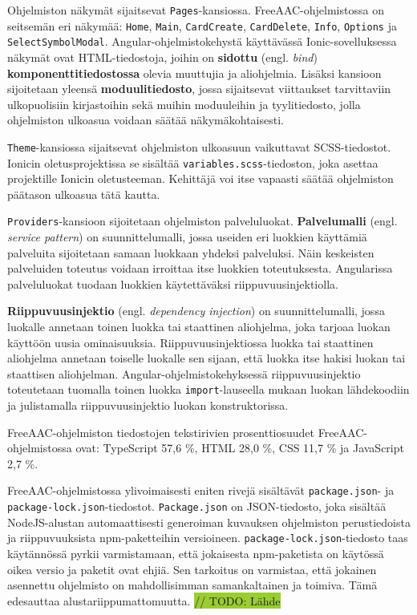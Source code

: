 \documentclass[utf8]{gradu3}
\begin{document}
Ohjelmiston näkymät sijaitsevat \texttt{Pages}-kansiossa. FreeAAC-ohjelmistossa on seitsemän eri näkymää: \texttt{Home}, \texttt{Main}, \texttt{CardCreate}, \texttt{CardDelete}, \texttt{Info}, \texttt{Options} ja \texttt{SelectSymbolModal}. Angular-ohjelmistokehystä käyttävässä Ionic-sovelluksessa näkymät ovat HTML-tiedostoja, joihin on \textbf{sidottu} (engl. \textit{bind}) \textbf{komponenttitiedostossa} olevia muuttujia ja aliohjelmia. Lisäksi kansioon sijoitetaan yleensä \textbf{moduulitiedosto}, jossa sijaitsevat viittaukset tarvittaviin ulkopuolisiin kirjastoihin sekä muihin moduuleihin ja tyylitiedosto, jolla ohjelmiston ulkoasua voidaan säätää näkymäkohtaisesti.

\texttt{Theme}-kansiossa sijaitsevat ohjelmiston ulkoasuun vaikuttavat SCSS-tiedostot. Ionicin oletusprojektissa se sisältää \texttt{variables.scss}-tiedoston, joka asettaa projektille Ionicin oletusteeman. Kehittäjä voi itse vapaasti säätää ohjelmiston päätason ulkoasua tätä kautta.

\texttt{Providers}-kansioon sijoitetaan ohjelmiston palveluluokat. \textbf{Palvelumalli} (engl. \textit{service pattern}) on suunnittelumalli, jossa useiden eri luokkien käyttämiä palveluita sijoitetaan samaan luokkaan yhdeksi palveluksi. Näin keskeisten palveluiden toteutus voidaan irroittaa itse luokkien toteutuksesta. Angularissa palveluluokat tuodaan luokkien käytettäväksi riippuvuusinjektiolla.

\textbf{Riippuvuusinjektio} (engl. \textit{dependency injection}) on suunnittelumalli, jossa luokalle annetaan toinen luokka tai staattinen aliohjelma, joka tarjoaa luokan käyttöön uusia ominaisuuksia. Riippuvuusinjektiossa luokka tai staattinen aliohjelma annetaan toiselle luokalle sen sijaan, että luokka itse hakisi luokan tai staattisen aliohjelman. Angular-ohjelmistokehyksessä riippuvuusinjektio toteutetaan tuomalla toinen luokka \texttt{import}-lauseella mukaan luokan lähdekoodiin ja julistamalla riippuvuusinjektio luokan konstruktorissa.

FreeAAC-ohjelmiston tiedostojen tekstirivien prosenttiosuudet FreeAAC-ohjelmistossa ovat: TypeScript 57,6 \%, HTML 28,0 \%, CSS 11,7 \% ja JavaScript 2,7 \%.

FreeAAC-ohjelmistossa ylivoimaisesti eniten rivejä sisältävät \texttt{package.json}- ja \texttt{package-lock.json}-tiedostot. \texttt{Package.json} on JSON-tiedosto, joka sisältää NodeJS-alustan automaattisesti generoiman kuvauksen ohjelmiston perustiedoista ja riippuvuuksista npm-paketteihin versioineen. \texttt{package-lock.json}-tiedosto taas käytännössä pyrkii varmistamaan, että jokaisesta npm-paketista on käytössä oikea versio ja paketit ovat ehjiä. Sen tarkoitus on varmistaa, että jokainen asennettu ohjelmisto on mahdollisimman samankaltainen ja toimiva. Tämä edesauttaa alustariippumattomuutta. \colorbox{YellowGreen}{// TODO: Lähde}
\end{document}
